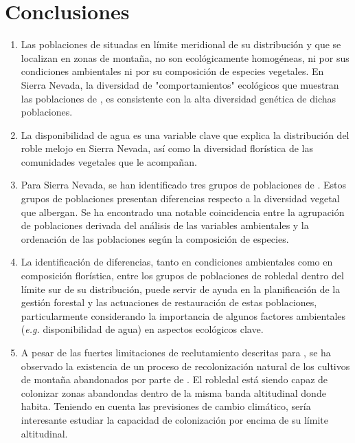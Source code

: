 %
\section*{Conclusiones}\label{sec:conclussions:spa}

\begin{enumerate}
\renewcommand{\labelenumi}{\textbf{\textcolor{ctcolormain}{\arabic{enumi}.}}}

    \item Las poblaciones de \Qpy situadas en límite meridional de su distribución y que se localizan en zonas de montaña, no son ecológicamente homogéneas, ni por sus condiciones ambientales ni por su composición de especies vegetales. En Sierra Nevada, la diversidad de "comportamientos" ecológicos que muestran las poblaciones de \Qp, es consistente con la alta diversidad genética de dichas poblaciones. 
    
    \item La disponibilidad de agua es una variable clave que explica la distribución del roble melojo en Sierra Nevada, así como la diversidad florística de las comunidades vegetales que le acompañan. 
    
    \item Para Sierra Nevada, se han identificado tres grupos de poblaciones de \Qp. Estos grupos de poblaciones presentan diferencias respecto a la diversidad vegetal que albergan. Se ha encontrado una notable coincidencia entre la agrupación de poblaciones derivada del análisis de las variables ambientales y la ordenación de las poblaciones según la composición de especies. 
    
    \item La identificación de diferencias, tanto en condiciones ambientales como en composición florística, entre los grupos de poblaciones de robledal dentro del límite sur de su distribución, puede servir de ayuda en la planificación de la gestión forestal y las actuaciones de restauración de estas poblaciones, particularmente considerando la importancia de algunos factores ambientales (\emph{e.g.} disponibilidad de agua) en aspectos ecológicos clave.
    
    \item A pesar de las fuertes limitaciones de reclutamiento descritas para \Qp, se ha observado la existencia de un proceso de recolonización natural de los cultivos de montaña abandonados por parte de \Qp. El robledal está siendo capaz de colonizar zonas abandondas dentro de la misma banda altitudinal donde habita. Teniendo en cuenta las previsiones de cambio climático, sería interesante estudiar la capacidad de colonización por encima de su límite altitudinal. 
    

\end{enumerate}
